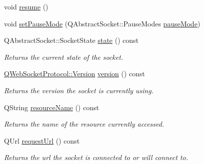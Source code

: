 \begin{DoxyCompactItemize}
void \mbox{\hyperlink{class_q_web_socket_af21dbd52b116cc5dae811548000001ee}{resume}} ()
\item 
void \mbox{\hyperlink{class_q_web_socket_a7d6650c827cace4ccb27988894872bcc}{set\+Pause\+Mode}} (Q\+Abstract\+Socket\+::\+Pause\+Modes \mbox{\hyperlink{class_q_web_socket_a15778b8a5f6ffb83c61b5e9b1701eb28}{pause\+Mode}})
\item 
\mbox{\label{class_q_web_socket_abf40a05dfbb85a86355c73f7c2f2c492}} 
Q\+Abstract\+Socket\+::\+Socket\+State \mbox{\hyperlink{class_q_web_socket_abf40a05dfbb85a86355c73f7c2f2c492}{state}} () const
\begin{DoxyCompactList}\small\item\em Returns the current state of the socket. \end{DoxyCompactList}\item 
\mbox{\label{class_q_web_socket_a691b38b043dfa8295242b39e04d2c0e7}} 
\mbox{\hyperlink{namespace_q_web_socket_protocol_ad53f2684577effe0a517eadb48714df3}{Q\+Web\+Socket\+Protocol\+::\+Version}} \mbox{\hyperlink{class_q_web_socket_a691b38b043dfa8295242b39e04d2c0e7}{version}} () const
\begin{DoxyCompactList}\small\item\em Returns the version the socket is currently using. \end{DoxyCompactList}\item 
\mbox{\label{class_q_web_socket_a93f3bd6750efba819a8ca6eeca0270a9}} 
Q\+String \mbox{\hyperlink{class_q_web_socket_a93f3bd6750efba819a8ca6eeca0270a9}{resource\+Name}} () const
\begin{DoxyCompactList}\small\item\em Returns the name of the resource currently accessed. \end{DoxyCompactList}\item 
\mbox{\label{class_q_web_socket_a7a5aa3a3efad1d7663d81e1979aaa63f}} 
Q\+Url \mbox{\hyperlink{class_q_web_socket_a7a5aa3a3efad1d7663d81e1979aaa63f}{request\+Url}} () const
\begin{DoxyCompactList}\small\item\em Returns the url the socket is connected to or will connect to. \end{DoxyCompactList}\item 

\end{DoxyCompactItemize}
